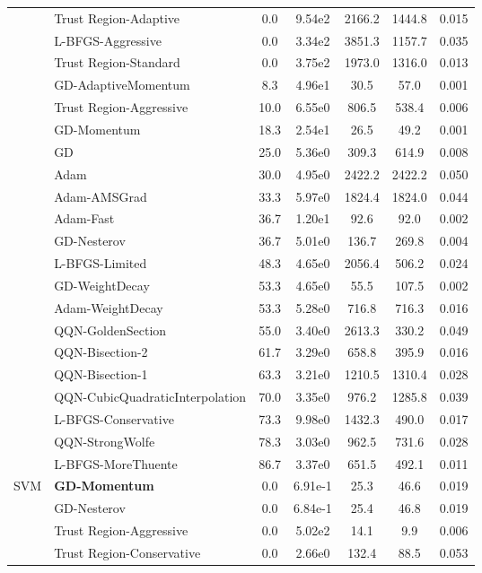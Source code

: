 \documentclass{article}
\begin{document}
\begin{table}[htbp]
{\begin{tabular}{p{2.5cm}p{2.5cm}*{5}{c}}
 & Trust Region-Adaptive & 0.0 & 9.54e2 & 2166.2 & 1444.8 & 0.015 \\
 & L-BFGS-Aggressive & 0.0 & 3.34e2 & 3851.3 & 1157.7 & 0.035 \\
 & Trust Region-Standard & 0.0 & 3.75e2 & 1973.0 & 1316.0 & 0.013 \\
 & GD-AdaptiveMomentum & 8.3 & 4.96e1 & 30.5 & 57.0 & 0.001 \\
 & Trust Region-Aggressive & 10.0 & 6.55e0 & 806.5 & 538.4 & 0.006 \\
 & GD-Momentum & 18.3 & 2.54e1 & 26.5 & 49.2 & 0.001 \\
 & GD & 25.0 & 5.36e0 & 309.3 & 614.9 & 0.008 \\
 & Adam & 30.0 & 4.95e0 & 2422.2 & 2422.2 & 0.050 \\
 & Adam-AMSGrad & 33.3 & 5.97e0 & 1824.4 & 1824.0 & 0.044 \\
 & Adam-Fast & 36.7 & 1.20e1 & 92.6 & 92.0 & 0.002 \\
 & GD-Nesterov & 36.7 & 5.01e0 & 136.7 & 269.8 & 0.004 \\
 & L-BFGS-Limited & 48.3 & 4.65e0 & 2056.4 & 506.2 & 0.024 \\
 & GD-WeightDecay & 53.3 & 4.65e0 & 55.5 & 107.5 & 0.002 \\
 & Adam-WeightDecay & 53.3 & 5.28e0 & 716.8 & 716.3 & 0.016 \\
 & QQN-GoldenSection & 55.0 & 3.40e0 & 2613.3 & 330.2 & 0.049 \\
 & QQN-Bisection-2 & 61.7 & 3.29e0 & 658.8 & 395.9 & 0.016 \\
 & QQN-Bisection-1 & 63.3 & 3.21e0 & 1210.5 & 1310.4 & 0.028 \\
 & QQN-CubicQuadraticInterpolation & 70.0 & 3.35e0 & 976.2 & 1285.8 & 0.039 \\
 & L-BFGS-Conservative & 73.3 & 9.98e0 & 1432.3 & 490.0 & 0.017 \\
 & QQN-StrongWolfe & 78.3 & 3.03e0 & 962.5 & 731.6 & 0.028 \\
 & L-BFGS-MoreThuente & 86.7 & 3.37e0 & 651.5 & 492.1 & 0.011 \\
\midrule
\multirow{25}{*}{SVM} & \textbf{GD-Momentum} & 0.0 & 6.91e-1 & 25.3 & 46.6 & 0.019 \\
 & GD-Nesterov & 0.0 & 6.84e-1 & 25.4 & 46.8 & 0.019 \\
 & Trust Region-Aggressive & 0.0 & 5.02e2 & 14.1 & 9.9 & 0.006 \\
 & Trust Region-Conservative & 0.0 & 2.66e0 & 132.4 & 88.5 & 0.053 \\

\end{tabular}}
\end{table}
\end{document}
